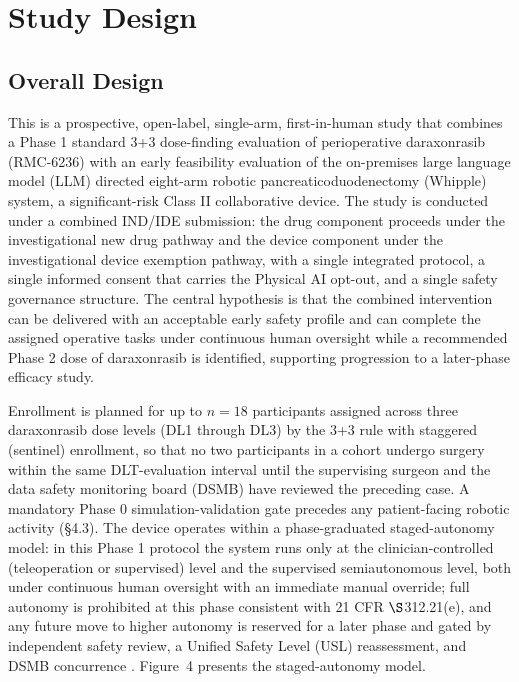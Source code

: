 \section{Study Design}

\subsection{Overall Design}

This is a prospective, open-label, single-arm, first-in-human study that combines
a Phase 1 standard 3+3 dose-finding evaluation of perioperative daraxonrasib
(RMC-6236) with an early feasibility evaluation of the on-premises large language
model (LLM) directed eight-arm robotic pancreaticoduodenectomy (Whipple) system,
a significant-risk Class II collaborative device. The study is conducted under a
combined IND/IDE submission: the drug component proceeds under the investigational
new drug pathway and the device component under the investigational device
exemption pathway, with a single integrated protocol, a single informed consent
that carries the Physical AI opt-out, and a single safety governance structure.
The central hypothesis is that the combined intervention can be delivered with an
acceptable early safety profile and can complete the assigned operative tasks
under continuous human oversight while a recommended Phase 2 dose of daraxonrasib
is identified, supporting progression to a later-phase efficacy study.

Enrollment is planned for up to $n=18$ participants assigned across three
daraxonrasib dose levels (DL1 through DL3) by the 3+3 rule with staggered
(sentinel) enrollment, so that no two participants in a cohort undergo surgery
within the same DLT-evaluation interval until the supervising surgeon and the
data safety monitoring board (DSMB) have reviewed the preceding case. A mandatory
Phase 0 simulation-validation gate precedes any patient-facing robotic activity
(\S4.3). The device operates within a phase-graduated staged-autonomy model: in
this Phase 1 protocol the system runs only at the clinician-controlled
(teleoperation or supervised) level and the supervised semiautonomous level, both
under continuous human oversight with an immediate manual override; full
autonomy is prohibited at this phase consistent with 21 CFR $\S$312.21(e), and
any future move to higher autonomy is reserved for a later phase and gated by
independent safety review, a Unified Safety Level (USL) reassessment, and DSMB
concurrence \cite{ecfr2026part812}. Figure~4 presents the staged-autonomy model.

